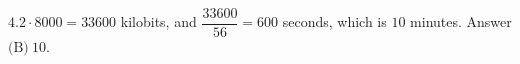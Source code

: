 $4.2\cdot8000=33600$ kilobits, and $\dfrac{33600}{56}=600$ seconds, which is $10$ minutes. Answer $\boxed{\text{(B)}\ 10}$.
